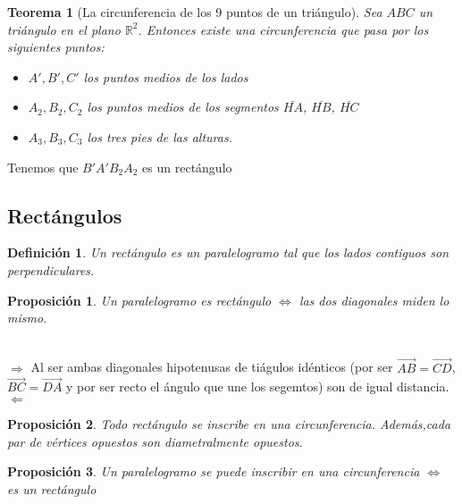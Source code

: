 \documentclass[11pt, a4paper, titlepage]{article}
\makeatletter
\renewenvironment{proof}[1][\proofname] {\vspace{-15pt}\par\pushQED{\qed}\normalfont\topsep6\p@\@plus6\p@\relax\trivlist\item[\hskip\labelsep\it#1\@addpunct{.}]\ignorespaces}{\popQED\endtrivlist\@endpefalse}
\newcommand{\R}{\mathbb{R}}
\renewcommand{\vec}{\overrightarrow}
\theoremstyle{theorem-style}
\newtheorem*{nth}{Teorema}
\newtheorem*{nprop}{Proposición}
\theoremstyle{definition-style}
\newtheorem*{ndef}{Definición}
\theoremstyle{remark-style}
\theoremstyle{example-style}
\makeatother
\begin{document}
\begin{nth}[La circunferencia de los 9 puntos de un triángulo]
  Sea $ABC$ un triángulo en el plano $\R^2$. Entonces existe una circunferencia que pasa por los siguientes puntos:
  \begin{itemize}
  \item $A',B',C'$ los puntos medios de los lados
  \item $A_2,B_2,C_2$ los puntos medios de los segmentos $\bar{HA}$, $\bar{HB}$, $\bar{HC}$
  \item $A_3,B_3,C_3$ los tres pies de las alturas.
  \end{itemize}
\end{nth}
\begin{proof}
  Tenemos que $B'A'B_2A_2$ es un rectángulo
\end{proof}



\subsection{Rectángulos}
\begin{ndef}
  Un rectángulo es un paralelogramo tal que los lados contiguos son perpendiculares.
\end{ndef}


\begin{nprop}
  Un paralelogramo es rectángulo $\iff$ las dos diagonales miden lo mismo.
\end{nprop}
\begin{proof}\hfill \\
  $\boxed{\Rightarrow}$
  Al ser ambas diagonales hipotenusas de tiágulos idénticos (por ser $\vec{AB}=\vec{CD}$, $\vec{BC}=\vec{DA}$ y por ser recto el ángulo que une los segemtos) son de igual distancia.\\
  $\boxed{\Leftarrow}$ 
  
\end{proof}

\begin{nprop}
  Todo rectángulo se inscribe en una circunferencia. Además,cada par de vértices opuestos son diametralmente opuestos.
\end{nprop}

\begin{nprop}
  Un paralelogramo se puede inscribir en una circunferencia $\iff$ es un rectángulo
\end{nprop}
\end{document}
